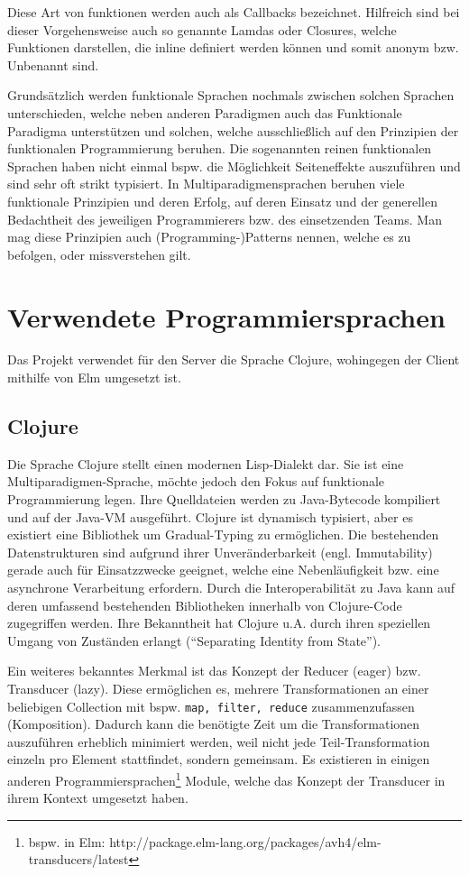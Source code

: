 Diese Art von funktionen werden auch als Callbacks bezeichnet.
Hilfreich sind bei dieser Vorgehensweise auch so genannte Lamdas oder Closures, welche Funktionen darstellen, die inline definiert werden können und somit anonym \ac{bzw.} Unbenannt sind.
\par
Grundsätzlich werden funktionale Sprachen nochmals zwischen solchen Sprachen unterschieden, welche neben anderen Paradigmen auch das Funktionale Paradigma unterstützen und solchen, welche ausschließlich auf den Prinzipien der funktionalen Programmierung beruhen.
Die sogenannten reinen funktionalen Sprachen haben nicht einmal \ac{bspw.} die Möglichkeit Seiteneffekte auszuführen und sind sehr oft strikt typisiert.
In Multiparadigmensprachen beruhen viele funktionale Prinzipien und deren Erfolg, auf deren Einsatz und der generellen Bedachtheit des jeweiligen Programmierers \ac{bzw.} des einsetzenden Teams.
Man mag diese Prinzipien auch (Programming-)Patterns nennen, welche es zu befolgen, oder missverstehen gilt.

\section{Verwendete Programmiersprachen}
Das Projekt verwendet für den Server die Sprache Clojure, wohingegen der Client mithilfe von Elm umgesetzt ist.

\subsection{Clojure}
Die Sprache Clojure stellt einen modernen Lisp-Dialekt dar.
Sie ist eine Multiparadigmen-Sprache, möchte jedoch den Fokus auf funktionale Programmierung legen.
Ihre Quelldateien werden zu Java-Bytecode kompiliert und auf der Java-VM ausgeführt.
Clojure ist dynamisch typisiert, aber es existiert eine Bibliothek um Gradual-Typing zu ermöglichen.
Die bestehenden Datenstrukturen sind aufgrund ihrer Unveränderbarkeit (engl. Immutability) gerade auch für Einsatzzwecke geeignet, welche eine Nebenläufigkeit bzw. eine asynchrone Verarbeitung erfordern.
Durch die Interoperabilität zu Java kann auf deren umfassend bestehenden Bibliotheken innerhalb von Clojure-Code zugegriffen werden.
Ihre Bekanntheit hat Clojure \ac{u.A.} durch ihren speziellen Umgang von Zuständen erlangt ("`Separating Identity from State"').
\par
Ein weiteres bekanntes Merkmal ist das Konzept der Reducer (eager) bzw. Transducer (lazy).
Diese ermöglichen es, mehrere Transformationen an einer beliebigen Collection mit \ac{bspw.} \texttt{map, filter, reduce} zusammenzufassen (Komposition).
Dadurch kann die benötigte Zeit um die Transformationen auszuführen erheblich minimiert werden, weil nicht jede Teil-Transformation einzeln pro Element stattfindet, sondern gemeinsam.
Es existieren in einigen anderen Programmiersprachen\footnote{\ac{bspw.} in Elm: http://package.elm-lang.org/packages/avh4/elm-transducers/latest} Module, welche das Konzept der Transducer in ihrem Kontext umgesetzt haben.


